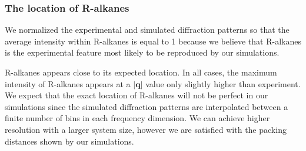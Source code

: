 \documentclass[journal=jpcbfk,manuscript=article]{achemso}
\begin{document}
%
  
  \subsubsection{The location of R-alkanes}\label{section:ralkanes}

  We normalized the experimental and simulated diffraction patterns so that the average
  intensity within R-alkanes is equal to 1 because we believe that R-alkanes is the
  experimental feature most likely to be reproduced by our simulations.
  
  R-alkanes appears close to its expected location. In all cases, the maximum intensity
  of R-alkanes appears at a $|\mathbf{q}|$ value only slightly higher than experiment. 
  We expect that the exact location of R-alkanes will not be perfect in our simulations
  since the simulated diffraction patterns are interpolated between a finite number of
  bins in each frequency dimension. We can achieve higher resolution with a larger
  system size, however we are satisfied with the packing distances shown by our simulations.
\end{document}
